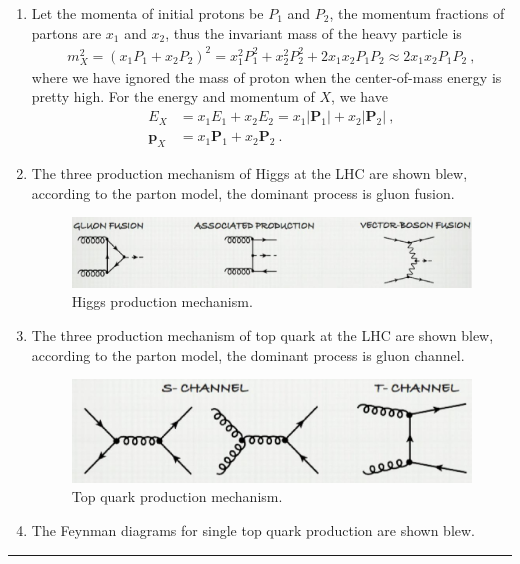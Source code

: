 \documentclass[12pt,twoside]{report}
\numberwithin{problemname}{chapter}
\newenvironment{solution}{\vspace{1em}\par\noindent{\large\textbf{\textsc{Solution}}}\par}{\vspace{1em}\hrule}
\begin{document}
\begin{solution}
    \begin{enumerate}[1)]
        \item Let the momenta of initial protons be $P_1$ and $P_2$, the momentum fractions of partons are $x_1$ and $x_2$, thus the invariant mass of the heavy particle is
        \begin{align}
            m_X^2=(x_1P_1+x_2P_2)^2=x_1^2P_1^2+x_2^2P_2^2+2x_1x_2P_1P_2\approx 2x_1x_2P_1P_2\ ,
        \end{align}
        where we have ignored the mass of proton when the center-of-mass energy is pretty high. For the energy and momentum of $X$, we have
        \begin{align}
            E_X&=x_1E_1+x_2E_2=x_1|\mathbf{P}_1|+x_2|\mathbf{P}_2|\ , \nonumber \\
            \mathbf{p}_X&=x_1\mathbf{P}_1+x_2\mathbf{P}_2\ .
        \end{align}
        \item The three production mechanism of Higgs at the LHC are shown blew, according to the parton model, the dominant process is gluon fusion.
        \begin{figure}
        \centering
        \includegraphics[width=1.1\textwidth]{feynman1.png}
        \caption{\label{fig:HiggsFeynman2}Higgs production mechanism.}
        \end{figure}
        \item The three production mechanism of top quark at the LHC are shown blew, according to the parton model, the dominant process is gluon channel.
        \begin{figure}
        \centering
        \includegraphics[width=1.1\textwidth]{feynman2.png}
        \caption{\label{fig:TopFeynman2}Top quark production mechanism.}
        \end{figure}
        \item The Feynman diagrams for single top quark production are shown blew.

\end{enumerate}
\end{solution}
\end{document}
